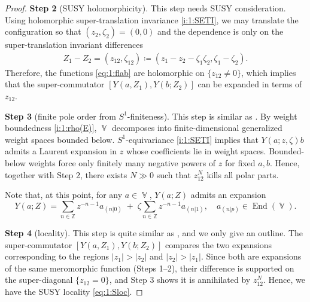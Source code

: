 \documentclass[final,reqno]{amsart}
\numberwithin{equation}{section}
\theoremstyle{definition}
\newtheorem{rmk}[thm]{Remark}
\newcommand{\ceq}{\coloneqq} %
\newcommand{\bbZ}{\mathbb{Z}}
\newcommand{\sfC}{\mathsf{C}}
\DeclareMathOperator{\bbV}{\mathbb{V}}
\DeclareMathOperator{\End}{End}
\begin{document}
\begin{proof}
\smallskip\noindent
\textbf{Step 2} (SUSY holomorphicity).
This step needs SUSY consideration.
Using holomorphic super-translation invariance \ref{i:1:SETI}, 
we may translate the configuration so that $(z_2,\zeta_2)=(0,0)$ 
and the dependence is only on the super-translation invariant differences
\begin{align}\label{eq:1:Z12}
 Z_1 - Z_2 = (z_{12},\zeta_{12}) \ceq 
(z_1-z_2-\zeta_1\zeta_2,\zeta_1-\zeta_2).
\end{align}
Therefore, the functions \eqref{eq:1:flab} are holomorphic 
on $\{z_{12} \ne 0\}$, which implies that the super-commutator 
$[Y(a,Z_1),Y(b;Z_2)]$ can be expanded in terms of $z_{12}$. 

\smallskip\noindent
\textbf{Step 3} (finite pole order from $S^1$-finiteness).
This step is similar as \cite[Lemma 5.3.5]{CG1}. 
By weight boundedness \ref{i:1:rho(E)}, $\bbV$ decomposes into 
finite-dimensional generalized weight spaces bounded below.
$S^1$-equivariance \ref{i:1:SETI} implies that $Y(a;z,\zeta)b$ admits 
a Laurent expansion in $z$ whose coefficients lie in weight spaces. 
Bounded-below weights force 
only finitely many negative powers of $z$ for fixed $a,b$. 
Hence, together with Step 2, 
there exists $N \gg 0$ such that $z_{12}^N$ kills all polar parts.

Note that, at this point, for any $a\in\bbV$, $Y(a;Z)$ admits an expansion
\[
 Y(a;Z) = \sum_{n\in\bbZ} z^{-n-1}a_{(n|0)} \;+\;
    \zeta \sum_{n\in\bbZ} z^{-n-1}a_{(n|1)}, \quad 
 a_{(n|p)} \in \End(\bbV).
\]

\smallskip\noindent
\textbf{Step 4} (locality).
This step is quite similar as \cite[Proposition 5.3.6]{CG1}, 
and we only give an outline.
The super-commutator $[Y(a,Z_1),Y(b;Z_2)]$ compares the two expansions 
corresponding to the regions $|z_1|>|z_2|$ and $|z_2|>|z_1|$. 
Since both are expansions of the same meromorphic function (Steps 1--2), 
their difference is supported on the super-diagonal $\{z_{12} = 0\}$, 
and Step 3 shows it is annihilated by $z_{12}^N$. 
Hence, we have the SUSY locality \eqref{eq:1:Sloc}.
\end{proof}


\end{document}
